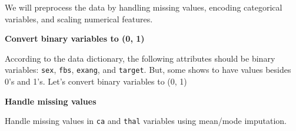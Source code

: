 \documentclass[
]{article}
\newenvironment{Shaded}{\begin{snugshade}}{\end{snugshade}}
\newcommand{\DecValTok}[1]{\textcolor[rgb]{0.00,0.00,0.81}{#1}}
\newcommand{\FunctionTok}[1]{\textcolor[rgb]{0.13,0.29,0.53}{\textbf{#1}}}
\newcommand{\NormalTok}[1]{#1}
\newcommand{\OtherTok}[1]{\textcolor[rgb]{0.56,0.35,0.01}{#1}}
\newcommand{\SpecialCharTok}[1]{\textcolor[rgb]{0.81,0.36,0.00}{\textbf{#1}}}
\begin{document}
We will preprocess the data by handling missing values, encoding
categorical variables, and scaling numerical features.

\textbf{Convert binary variables to (0, 1)}

According to the data dictionary, the following attributes should be
binary variables: \texttt{sex}, \texttt{fbs}, \texttt{exang}, and
\texttt{target}. But, some shows to have values besides 0's and 1's.
Let's convert binary variables to (0, 1)

\begin{Shaded}
\end{Shaded}

\textbf{Handle missing values}

Handle missing values in \texttt{ca} and \texttt{thal} variables using
mean/mode imputation.
\end{document}

